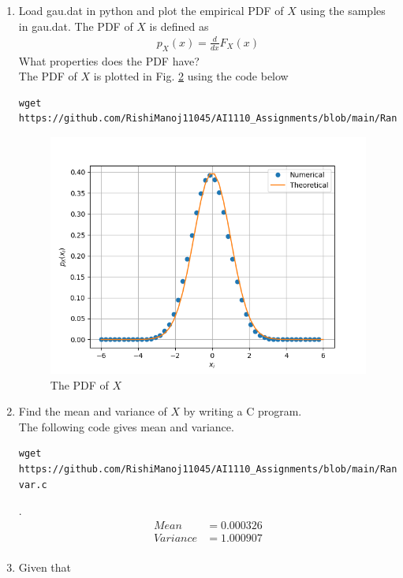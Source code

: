 \documentclass[journal,12pt,twocolumn]{IEEEtran}
\renewcommand\thesection{\arabic{section}}
\begin{document}
\begin{enumerate}[label=\thesection.\arabic*
,ref=\thesection.\theenumi]
\begin{figure}[ht]
\caption{The CDF of $X$}
\label{fig:gau_cdf}
\end{figure}
\item
Load gau.dat in python and plot the empirical PDF of $X$ using the samples in gau.dat. The PDF of $X$ is defined as
\begin{align}
p_{X}(x) = \frac{d}{dx}F_{X}(x)
\end{align}
What properties does the PDF have?
\\
\solution The PDF of $X$ is plotted in Fig. \ref{fig:gau_pdf} using the code below
\begin{lstlisting}
wget https://github.com/RishiManoj11045/AI1110_Assignments/blob/main/RandomNumbers/codes/gaussian_pdf.py
\end{lstlisting}
\begin{figure}
\centering
\includegraphics[width=\columnwidth]{figs/gau_pdf.png}
\caption{The PDF of $X$}
\label{fig:gau_pdf}
\end{figure}
\item Find the mean and variance of $X$ by writing a C program.\\
\solution The following code gives mean and variance.
\begin{lstlisting}
wget https://github.com/RishiManoj11045/AI1110_Assignments/blob/main/RandomNumbers/codes/gau_mean-var.c
\end{lstlisting}.
\begin{align*}
    Mean &= 0.000326 \\
    Variance &= 1.000907 \\
\end{align*}
\item Given that 

\end{enumerate}
\end{document}
